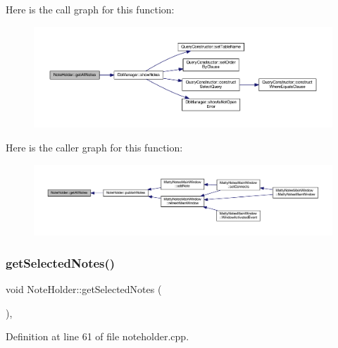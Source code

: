 Here is the call graph for this function\+:
\nopagebreak
\begin{figure}[H]
\begin{center}
\leavevmode
\includegraphics[width=350pt]{classNoteHolder_a53853f7b183e262eb165bdb3af8f3e45_cgraph}
\end{center}
\end{figure}
Here is the caller graph for this function\+:
\nopagebreak
\begin{figure}[H]
\begin{center}
\leavevmode
\includegraphics[width=350pt]{classNoteHolder_a53853f7b183e262eb165bdb3af8f3e45_icgraph}
\end{center}
\end{figure}
\hypertarget{classNoteHolder_ab4709f2b857351ba118201a159c5cd6c}{}\label{classNoteHolder_ab4709f2b857351ba118201a159c5cd6c} 
\subsubsection{\texorpdfstring{get\+Selected\+Notes()}{getSelectedNotes()}}
{\footnotesize\ttfamily void Note\+Holder\+::get\+Selected\+Notes (\begin{DoxyParamCaption}{ }\end{DoxyParamCaption})\hspace{0.3cm}{\ttfamily [static]}, {\ttfamily [private]}}



Definition at line 61 of file noteholder.\+cpp.

